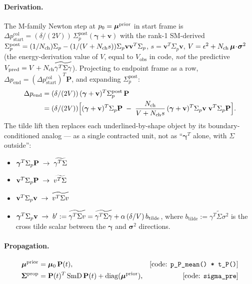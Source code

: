 \documentclass[11pt]{article}
\begin{document}
\paragraph{Derivation.}
The M-family Newton step at $p_0=\boldsymbol{\mu}^{\mathrm{prior}}$ in start frame is
\(
  \Delta p_{\text{start}}^{\text{col}}
  = (\delta/(2V))\,\Sigma_p^{\text{post}}(\boldsymbol{\gamma}+\mathbf{v})
\)
with the rank-1 SM-derived
\(
  \Sigma_p^{\text{post}} = (1/N_{\mathrm{ch}})\Sigma_p - (1/(V+N_{\mathrm{ch}} s))\Sigma_p\mathbf{v}\mathbf{v}^{T}\Sigma_p
\),
$s=\mathbf{v}^{T}\Sigma_p\mathbf{v}$, $V=\epsilon^2+N_{\mathrm{ch}}\,\boldsymbol{\mu}\!\cdot\!\boldsymbol{\sigma}^2$
(the energy-derivation value of $V$, equal to $V_{\mathrm{obs}}$ in code, \emph{not} the predictive $V_{\mathrm{pred}}=V+N_{\mathrm{ch}}\widetilde{\gamma^{T}\Sigma\gamma}$).
Projecting to endpoint frame as a row, $\Delta p_{\text{end}} = (\Delta p_{\text{start}}^{\text{col}})^{T}\mathbf{P}$, and expanding $\Sigma_p^{\text{post}}$:
\begin{align*}
  \Delta p_{\text{end}}
  &= (\delta/(2V))\,(\boldsymbol{\gamma}+\mathbf{v})^{T}\Sigma_p^{\text{post}}\,\mathbf{P}\\
  &= (\delta/(2V))\Bigl[(\boldsymbol{\gamma}+\mathbf{v})^{T}\Sigma_p\mathbf{P}
       \;-\; \frac{N_{\mathrm{ch}}}{V+N_{\mathrm{ch}} s}\,(\boldsymbol{\gamma}+\mathbf{v})^{T}\Sigma_p\mathbf{v}\;\mathbf{v}^{T}\Sigma_p\mathbf{P}\Bigr].
\end{align*}
The tilde lift then replaces each underlined-by-shape object by its boundary-conditioned analog --- as a single contracted unit, not as ``$\boldsymbol{\gamma}^{T}$ alone, with $\Sigma$ outside'':
\begin{itemize}
  \item $\boldsymbol{\gamma}^{T}\Sigma_p\mathbf{P} \;\to\; \widetilde{\gamma^{T}\Sigma}$
  \item $\mathbf{v}^{T}\Sigma_p\mathbf{P} \;\to\; \widetilde{v^{T}\Sigma}$
  \item $\mathbf{v}^{T}\Sigma_p\mathbf{v} \;\to\; \widetilde{v^{T}\Sigma v}$
  \item $\boldsymbol{\gamma}^{T}\Sigma_p\mathbf{v} \;\to\; b' := \widetilde{\gamma^{T}\Sigma v} = \widetilde{\gamma^{T}\Sigma\gamma} + \alpha\,(\delta/V)\,b_{\text{tilde}}$,
        where $b_{\text{tilde}} := \widetilde{\gamma^{T}\Sigma\sigma^2}$ is the cross tilde scalar between the $\boldsymbol{\gamma}$ and $\boldsymbol{\sigma}^2$ directions.
\end{itemize}

\paragraph{Propagation.}
\begin{align}
  \boldsymbol{\mu}^{\mathrm{prior}} &= \boldsymbol{\mu}_0\,\mathbf{P}(t),
   &\text{[code: \texttt{p\_P\_mean() * t\_P()}]}\\
  \boldsymbol{\Sigma}^{\mathrm{prop}}
  &= \mathbf{P}(t)^{T}\,\mathrm{SmD}\,\mathbf{P}(t) + \operatorname{diag}(\boldsymbol{\mu}^{\mathrm{prior}}),
   &\text{[code: \texttt{sigma\_pre}]}
\end{align}
\end{document}

